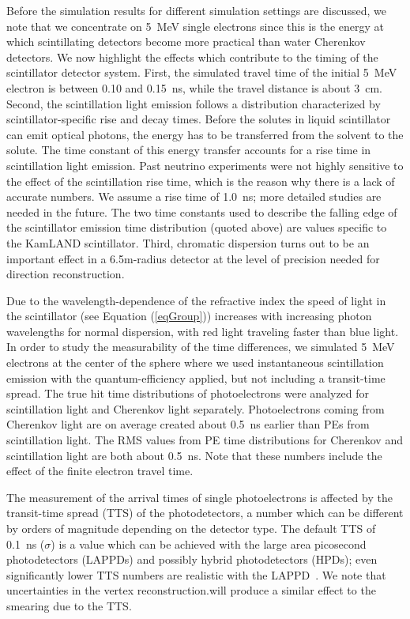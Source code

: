 \documentclass[aps,prc,twocolumn,groupedaddress,showpacs,amsmath,amssymb,floatfix,superscriptaddress]{revtex4}
\begin{document}
Before the simulation results for different simulation settings are
discussed, we note that we concentrate on 5~MeV single electrons since
this is the energy at which scintillating detectors become more practical
than water Cherenkov detectors.  We now highlight the effects which
contribute to the timing of the scintillator detector system.  First,
the simulated travel time of the initial 5~MeV electron is between
0.10 and 0.15~ns, while the travel distance is about 3~cm. Second, the
scintillation light emission follows a distribution characterized by
scintillator-specific rise and decay times. Before the solutes in
liquid scintillator can emit optical photons, the energy has to be
transferred from the solvent to the solute. The time constant of this
energy transfer accounts for a rise time in scintillation light
emission. Past neutrino experiments were not highly sensitive to the
effect of the scintillation rise time, which is the reason why there
is a lack of accurate numbers. We assume a rise time of 1.0~ns; more
detailed studies are needed in the future. The two time constants used
to describe the falling edge of the scintillator emission time
distribution (quoted above) are values specific to the KamLAND
scintillator. Third, chromatic dispersion turns out to be an important
effect in a 6.5m-radius detector at the level of precision needed for
direction reconstruction. 

Due to the wavelength-dependence of the refractive index the speed of
light in the scintillator (see Equation (\ref{eqGroup})) increases
with increasing photon wavelengths for normal dispersion, with red
light traveling faster than blue light.  In order to study the
measurability of the time differences, we simulated 5~MeV electrons at
the center of the sphere where we used instantaneous scintillation
emission with the quantum-efficiency applied, but not including a
transit-time spread. The true hit time distributions of photoelectrons
were analyzed for scintillation light and Cherenkov light
separately. Photoelectrons coming from Cherenkov light are on average
created about 0.5~ns earlier than PEs from scintillation light. The
RMS values from PE time distributions for Cherenkov and scintillation
light are both about 0.5~ns. Note that these numbers include the
effect of the finite electron travel time.

The measurement of the arrival times of single photoelectrons is
affected by the transit-time spread (TTS) of the photodetectors, a
number which can be different by orders of magnitude depending on the
detector type. The default TTS of 0.1~ns ($\sigma$) is a value which
can be achieved with the large area picosecond photodetectors
(LAPPDs)\cite{LAPPDSum,LAPPDTDR} and possibly hybrid photodetectors
(HPDs)\cite{hpdThesis}; even significantly lower TTS numbers are
realistic with the LAPPD~\cite{RSI_paper,PSEC4_paper,anode_paper}. We
note that uncertainties in the vertex reconstruction.will produce a
similar effect to the smearing due to the TTS.
\end{document}
